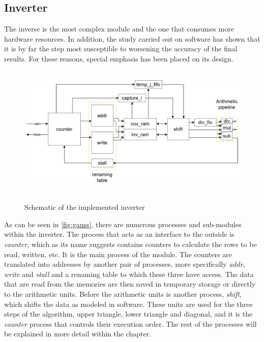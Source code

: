 \subsection{Inverter}
The inverse is the most complex module and the one that consumes more hardware resources. In addition, the study carried out on software has shown that it is by far the step most susceptible to worsening the accuracy of the final results. For these reasons, special emphasis has been placed on its design.

\begin{figure}[h!]
\centering\textbf{
\includegraphics[height=2.5in]{figures/gauss.png}}
\caption{Schematic of the implemented inverter}
  \label{fig:gauss}
\end{figure}

As can be seen in \autoref{fig:gauss}, there are numerous processes and sub-modules within the inverter. The process that acts as an interface to the outside is \textit{counter}, which as its name suggests contains counters to calculate the rows to be read, written, etc. It is the main process of the module. The counters are translated into addresses by another pair of processes, more specifically \textit{addr}, \textit{write} and \textit{stall} and a renaming table to which these three have access. The data that are read from the memories are then saved in temporary storage or directly to the arithmetic units. Before the arithmetic units is another process, \textit{shift}, which shifts the data as modeled in software. These units are used for the three steps of the algorithm, upper triangle, lower triangle and diagonal, and it is the \textit{counter} process that controls their execution order. The rest of the processes will be explained in more detail within the chapter.

\pagebreak

